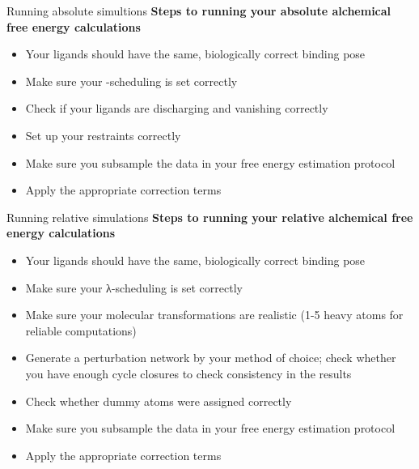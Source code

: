 \documentclass[9pt,bestpractices]{livecoms}
\begin{document}
\begin{Checklists*}[p!]
\begin{checklist}{Running absolute simultions}
        \textbf{Steps to running your absolute alchemical free energy calculations}
\begin{itemize}
 \item Your ligands should have the same, biologically correct binding pose
        \item Make sure your \textlambda-scheduling is set correctly
        \item Check if your ligands are discharging and vanishing correctly
        \item Set up your restraints correctly
        \item Make sure you subsample the data in your free energy estimation protocol
        \item Apply the appropriate correction terms
\end{itemize}
\end{checklist}

\begin{checklist}{Running relative simulations}
        \textbf{Steps to running your relative alchemical free energy calculations}
\begin{itemize}
   \item Your ligands should have the same, biologically correct binding pose
        \item Make sure your λ-scheduling is set correctly
        \item Make sure your molecular transformations are realistic (1-5 heavy atoms for reliable computations)
        \item Generate a perturbation network by your method of choice; check whether you have enough cycle closures to check consistency in the results
        \item Check whether dummy atoms were assigned correctly
        \item Make sure you subsample the data in your free energy estimation protocol
        \item Apply the 
        appropriate correction terms
\end{itemize}
\end{checklist}


\end{Checklists*}
\end{document}
